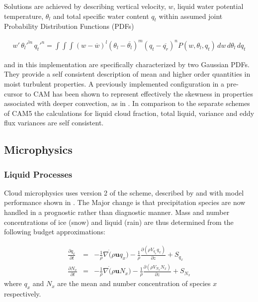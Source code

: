 Solutions are achieved by describing vertical velocity, $w$, liquid water potential temperature, $\theta_l$ and total specific water content $q_t$ within
assumed joint Probability Distribution Functions (PDFs) 

\begin{eqnarray}
  \overline{{w'}\,{\theta_l'^m}\,{ q_t'^n}}  =  \int\int\int(w-\overline{w})^l(\theta_l-\overline{\theta_l})^m(q_t-\overline{q_r})^n P(w,\theta_l,q_t)\,dw\,d\theta_l\,dq_t
\end{eqnarray}

 and in this implementation are specifically characterized by two Gaussian PDFs. They provide a self consistent description of mean and higher order quantities in moist turbulent properties. A previously implemented configuration in a pre-cursor to CAM \citep[CAM5.5, ][]{Bogenschutz2018} has been shown to represent effectively the skewness in properties associated with deeper convection, as in \citep{Bogenschutz2010}. In comparison to the separate schemes of CAM5 the calculations for liquid cloud fraction, total liquid, variance and eddy flux variances are self consistent.



\subsection{Microphysics}
\subsubsection{Liquid Processes}

Cloud microphysics uses version 2 of the \cite{Morrison08} scheme, described by \cite{Gettelman2015} and with model performance shown in \cite{Gettelman2015a}. The Major change is that precipitation species are now handled in a prognostic rather than diagnostic manner. Mass and number concentrations of ice (snow) and liquid (rain) are thus determined from the following budget approximations:

\begin{eqnarray}
  \frac{\partial q_x}{\partial t} & = & -\frac{1}{\rho}\nabla\dot(\rho \mathbf{u} q_x) - \frac{1}{\rho}\frac{\partial(\rho V_{q_x}q_x)}{\partial z}+S_{q_x}  \\
  \frac{\partial N_x}{\partial t} & = & -\frac{1}{\rho}\nabla\dot(\rho \mathbf{u} N_x) - \frac{1}{\rho}\frac{\partial(\rho V_{N_x}N_x)}{\partial z}+S_{N_x}
\end{eqnarray}
where $q_x$ and $N_x$ are the mean and number concentration of species $x$ respectively. 

